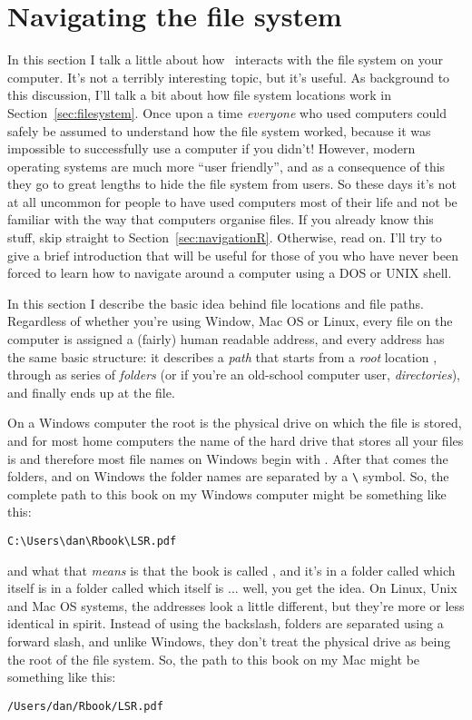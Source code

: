 \section{Navigating the file system\label{sec:navigation}}


In this section I talk a little about how \R\ interacts with the file system on your computer. It's not a terribly interesting topic, but it's useful.  As background to this discussion, I'll talk a bit about how file system locations work in Section~\ref{sec:filesystem}. Once upon a time {\it everyone} who used computers could safely be assumed to understand how the file system worked, because it was impossible to successfully use a computer if you didn't! However, modern operating systems are much more ``user friendly'', and as a consequence of this they go to great lengths to hide the file system from users. So these days it's not at all uncommon for people to have used computers most of their life and not be familiar with the way that computers organise files. If you already know this stuff, skip straight to Section~\ref{sec:navigationR}. Otherwise, read on. I'll try to give a brief introduction that will be useful for those of you who have never been forced to learn how to navigate around a computer using a DOS or UNIX shell. 


In this section I describe the basic idea behind file locations and file paths. Regardless of whether you're using Window, Mac OS or Linux, every file on the computer is assigned a (fairly) human readable address, and every address has the same basic structure: it describes a {\it path} that starts from a {\it root} location , through as series of {\it folders} (or if you're an old-school computer user, {\it directories}), and finally ends up at the file. 

On a Windows computer the root is the physical drive on which the file is stored, and for most home computers the name of the hard drive that stores all your files is  and therefore most file names on Windows begin with . After that comes the folders, and on Windows the folder names are separated by a \verb#\# symbol. So, the complete path to this book on my Windows computer might be something like this:
\begin{verbatim}
C:\Users\dan\Rbook\LSR.pdf
\end{verbatim}
and what that {\it means} is that the book is called , and it's in a folder called  which itself is in a folder called  which itself is ... well, you get the idea. On Linux, Unix and Mac OS systems, the addresses look a little different, but they're more or less identical in spirit. Instead of using the backslash, folders are separated using a forward slash, and unlike Windows, they don't treat the physical drive as being the root of the file system. So, the path to this book on my Mac might be something like this:
\begin{verbatim}
/Users/dan/Rbook/LSR.pdf
\end{verbatim}

